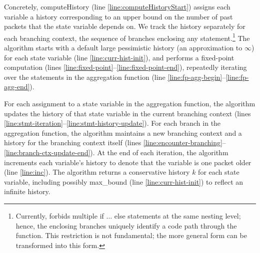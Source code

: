 Concretely, {\sc computeHistory} (line \ref{line:computeHistoryStart}) assigns
each variable a history corresponding to an upper bound on the number of past
packets that the state variable depends on. We track the history separately for
each branching context, \ie the sequence of branches enclosing any
statement.\footnote{Currently, \TheSystem forbids multiple {\ctfoot if ...
else} statements at the same nesting level; hence, the enclosing branches
uniquely identify a code path through the function. This restriction is not
fundamental; the more general form can be transformed into this form.} The
algorithm starts with a default large pessimistic history (\ie an approximation
to $\infty$) for each state variable (line \ref{line:curr-hist-init}), and
performs a fixed-point computation (lines
\ref{line:fixed-point}--\ref{line:fixed-point-end}), repeatedly iterating over
the statements in the aggregation function (line
\ref{line:fp-agg-begin}--\ref{line:fp-agg-end}).

For each assignment to a state variable in the aggregation function, the
algorithm updates the history of that state variable in the current branching
context (lines \ref{line:stmt-iteration}--\ref{line:stmt-history-update}). For
each branch in the aggregation function, the algorithm maintains a new
branching context and a history for the branching context itself (lines
\ref{line:encounter-branching}--\ref{line:branch-ctx-update-end}).  At the end
of each iteration, the algorithm increments each variable's history to denote
that the variable is one packet older (line \ref{line:inc}).  The algorithm
returns a conservative history $k$ for each state variable, including possibly
max\_bound (line \ref{line:curr-hist-init}) to reflect an infinite history.

